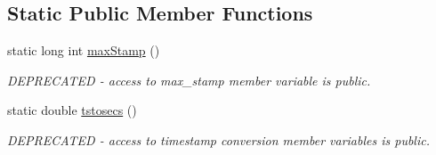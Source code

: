 \subsection*{Static Public Member Functions}
\begin{DoxyCompactItemize}
\item 
static long int \hyperlink{classev_1_1vtsHelper_aa7f1c13eb051773e9413b52bb52caad0}{max\+Stamp} ()\hypertarget{classev_1_1vtsHelper_aa7f1c13eb051773e9413b52bb52caad0}{}\label{classev_1_1vtsHelper_aa7f1c13eb051773e9413b52bb52caad0}

\begin{DoxyCompactList}\small\item\em D\+E\+P\+R\+E\+C\+A\+T\+ED -\/ access to max\+\_\+stamp member variable is public. \end{DoxyCompactList}\item 
static double \hyperlink{classev_1_1vtsHelper_a07d0dc3cd7743eff7d594e838ae23a01}{tstosecs} ()\hypertarget{classev_1_1vtsHelper_a07d0dc3cd7743eff7d594e838ae23a01}{}\label{classev_1_1vtsHelper_a07d0dc3cd7743eff7d594e838ae23a01}

\begin{DoxyCompactList}\small\item\em D\+E\+P\+R\+E\+C\+A\+T\+ED -\/ access to timestamp conversion member variables is public. \end{DoxyCompactList}\end{DoxyCompactItemize}
